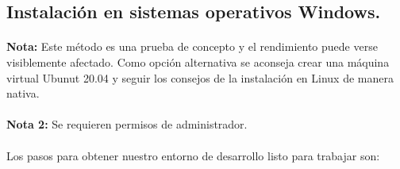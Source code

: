 \subsection{Instalación en sistemas operativos Windows.}

\paragraph{}\textbf{Nota:} Este método es una prueba de concepto y el rendimiento puede
verse visiblemente afectado. Como opción alternativa se aconseja crear una máquina
virtual Ubunut 20.04 y seguir los consejos de la instalación en Linux de manera nativa.

\paragraph{}\textbf{Nota 2:} Se requieren permisos de administrador.

\paragraph{}Los pasos para obtener nuestro entorno de desarrollo listo para trabajar son:

